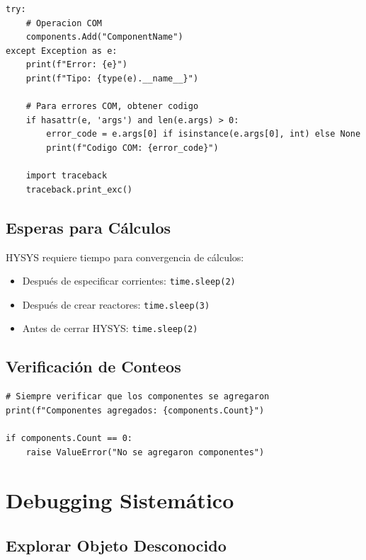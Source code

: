 \documentclass[12pt,a4paper]{article}
\begin{document}
\begin{lstlisting}
try:
    # Operacion COM
    components.Add("ComponentName")
except Exception as e:
    print(f"Error: {e}")
    print(f"Tipo: {type(e).__name__}")

    # Para errores COM, obtener codigo
    if hasattr(e, 'args') and len(e.args) > 0:
        error_code = e.args[0] if isinstance(e.args[0], int) else None
        print(f"Codigo COM: {error_code}")

    import traceback
    traceback.print_exc()
\end{lstlisting}

\subsection{Esperas para Cálculos}

\begin{infobox}
HYSYS requiere tiempo para convergencia de cálculos:
\begin{itemize}
    \item Después de especificar corrientes: \texttt{time.sleep(2)}
    \item Después de crear reactores: \texttt{time.sleep(3)}
    \item Antes de cerrar HYSYS: \texttt{time.sleep(2)}
\end{itemize}
\end{infobox}

\subsection{Verificación de Conteos}

\begin{lstlisting}
# Siempre verificar que los componentes se agregaron
print(f"Componentes agregados: {components.Count}")

if components.Count == 0:
    raise ValueError("No se agregaron componentes")
\end{lstlisting}

\section{Debugging Sistemático}

\subsection{Explorar Objeto Desconocido}
\end{document}
